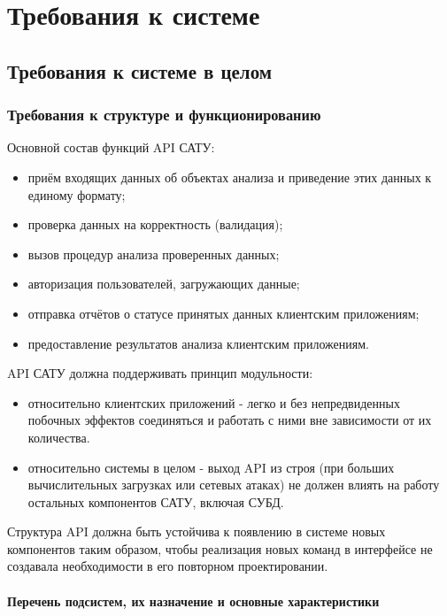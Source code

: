 \chapter{\enskip Требования к системе}

\section{\enskip Требования к системе в целом}

\subsection{\enskip Требования к структуре и функционированию}

\par
	Основной состав функций API САТУ:

	\begin{itemize}
		\item приём входящих данных об объектах анализа и приведение этих данных к единому формату;
		\item проверка данных на корректность (валидация);
		\item вызов процедур анализа проверенных данных;
		\item авторизация пользователей, загружающих данные;
		\item отправка отчётов о статусе принятых данных клиентским приложениям;
		\item предоставление результатов анализа клиентским приложениям.
	\end{itemize}
	
	API САТУ должна поддерживать принцип модульности:

	\begin{itemize}
		\item относительно клиентских приложений - легко и без непредвиденных побочных эффектов соединяться и работать с ними вне зависимости от их количества. 
		\item относительно системы в целом - выход API из строя (при больших вычислительных загрузках или сетевых атаках) не должен влиять на работу остальных компонентов САТУ, включая СУБД.
	\end{itemize}
 
	Структура API должна быть устойчива к появлению в системе новых компонентов таким образом, чтобы реализация новых команд в интерфейсе не создавала необходимости в его повторном проектировании.

\subsubsection{\enskip \nohyphens{Перечень подсистем, их назначение и основные характеристики}}

